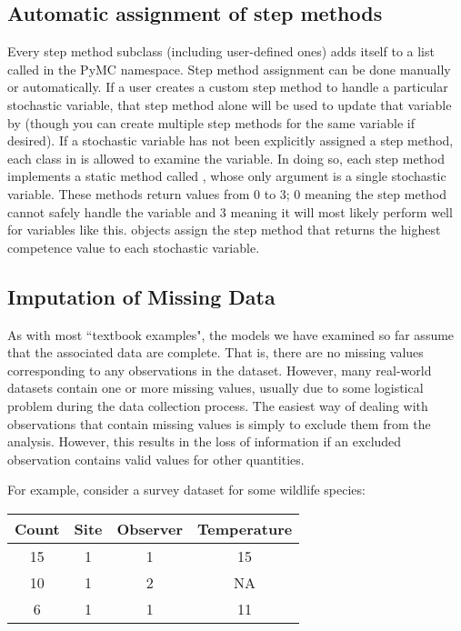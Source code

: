 \subsection*{Automatic assignment of step methods} 
Every step method subclass (including user-defined ones) adds itself to a list called  in the PyMC namespace. Step method assignment can be done manually or automatically. If a user creates a custom step method to handle a particular stochastic variable, that step method alone will be used to update that variable by  (though you can create multiple step methods for the same variable if desired). If a stochastic variable has not been explicitly assigned a step method, each class in  is allowed to examine the variable. In doing so, each step method implements a static method called , whose only argument is a single stochastic variable. These methods return values from 0 to 3; 0 meaning the step method cannot safely handle the variable and 3 meaning it will most likely perform well for variables like this.  objects assign the step method that returns the highest competence value to each stochastic variable.

\subsection*{Imputation of Missing Data} %

As with most ``textbook examples", the models we have examined so far assume that the associated data are complete. That is, there are no missing values corresponding to any observations in the dataset. However, many real-world datasets contain one or more missing values, usually due to some logistical problem during the data collection process. The easiest way of dealing with observations that contain missing values is simply to exclude them from the analysis. However, this results in the loss of information if an excluded observation contains valid values for other quantities. 

For example, consider a survey dataset for some wildlife species:

\begin{tabular}{cccc}
\hline
Count & Site & Observer & Temperature\\
\hline
15 & 1 & 1 & 15\\
10 & 1 & 2 & NA\\
6 & 1 & 1 & 11\\
\hline
\end{tabular}

